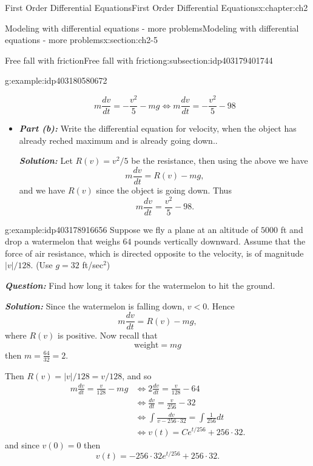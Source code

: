 \documentclass[oneside,10pt,]{book}
\newcommand{\alert}[1]{\textbf{\textit{#1}}}
\numberwithin{equation}{section}
\numberwithin{equation}{section}
\newcommand{\lt}{<}
\newcommand{\amp}{&}
\begin{document}
\begin{chapterptx}{First Order Differential Equations}{}{First Order Differential Equations}{}{}{x:chapter:ch2}
\begin{sectionptx}{Modeling with differential equations - more problems}{}{Modeling with differential equations - more problems}{}{}{x:section:ch2-5}
\begin{subsectionptx}{Free fall with friction}{}{Free fall with friction}{}{}{g:subsection:idp403179401744}
\begin{example}{}{g:example:idp403180580672}
\begin{itemize}[label=\textbullet]
\begin{equation*}
m\frac{dv}{dt}=-\frac{v^{2}}{5}-mg\iff m\frac{dv}{dt}=-\frac{v^{2}}{5}-98
\end{equation*}
%
\item{}\alert{Part (b):} Write the differential equation for velocity, when the object has already reched maximum and is already going down..%
\par
\alert{Solution:} Let \(R(v)=v^{2}/5\) be the resistance, then using the above we have%
\begin{equation*}
m\frac{dv}{dt}=R(v)-mg,
\end{equation*}
and we have \(R(v)\) since the object is going down. Thus%
\begin{equation*}
m\frac{dv}{dt}=\frac{v^{2}}{5}-98.
\end{equation*}
%
\end{itemize}
\end{example}
\begin{example}{}{g:example:idp403178916656}%
Suppose we fly a plane at an altitude of \(5000\) ft and drop a watermelon that weighs \(64\) pounds vertically downward. Assume that the force of air resistance, which is directed opposite to the velocity, is of magnitude \(\left|v\right|/128\). (Use \(g=32\) ft\slash{}sec\(^2\))%
\par
\alert{Question:} Find how long it takes for the watermelon to hit the ground.%
\par
\alert{Solution:} Since the watermelon is falling down, \(v\lt0\). Hence%
\begin{equation*}
m\frac{dv}{dt}=R(v)-mg,
\end{equation*}
where \(R(v)\) is positive. Now recall that%
\begin{equation*}
\text{weight}=mg
\end{equation*}
then \(m=\frac{64}{32}=2\).%
\par
Then \(R(v)=\left|v\right|/128=v/128\), and so%
\begin{align*}
m\frac{dv}{dt}=\frac{v}{128}-mg \amp \iff2\frac{dv}{dt}=\frac{v}{128}-64\\
\amp \iff\frac{dv}{dt}=\frac{v}{256}-32\\
\amp \iff\int\frac{dv}{v-256\cdot32}=\int\frac{1}{256}dt\\
\amp \iff v(t)=Ce^{t/256}+256\cdot32.
\end{align*}
and since \(v(0)=0\) then%
\begin{equation*}
v(t)=-256\cdot32e^{t/256}+256\cdot32.
\end{equation*}

\end{example}
\end{subsectionptx}
\end{sectionptx}
\end{chapterptx}
\end{document}
